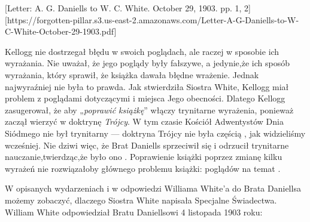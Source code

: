 
[Letter: A. G. Daniells to W. C. White. October 29, 1903. pp. 1, 2][https://forgotten-pillar.s3.us-east-2.amazonaws.com/Letter-A-G-Daniells-to-W-C-White-October-29-1903.pdf]

Kellogg nie dostrzegał błędu w swoich poglądach, ale raczej w sposobie ich wyrażania. Nie uważał, że jego poglądy były fałszywe, a jedynie,że ich sposób wyrażania, który sprawił, że książka dawała błędne wrażenie. Jednak najwyraźniej nie była to prawda. Jak stwierdziła Siostra White, Kellogg miał problem z poglądami dotyczącymi  i miejsca Jego obecności. Dlatego Kellogg zasugerował, że aby „\textit{poprawić książkę}” włączy trynitarne wyrażenia, ponieważ zaczął wierzyć w doktrynę \textit{Trójcy}. W tym czasie Kościół Adwentystów Dnia Siódmego nie był trynitarny — doktryna Trójcy nie była częścią , jak widzieliśmy wcześniej. Nie dziwi więc, że Brat Daniells sprzeciwił się i odrzucił trynitarne nauczanie,twierdząc,że było ono . Poprawienie książki poprzez zmianę kilku wyrażeń nie rozwiązałoby głównego problemu książki: poglądów na temat .

W opisanych wydarzeniach i w odpowiedzi Williama White'a do Brata Daniellsa możemy zobaczyć, dlaczego Siostra White napisała Specjalne Świadectwa. William White odpowiedział Bratu Daniellsowi 4 listopada 1903 roku:





